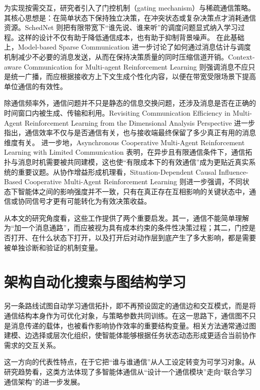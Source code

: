 为实现按需交互，研究者引入了门控机制（gating mechanism）与稀疏通信策略。其核心思想是：在简单状态下保持独立决策，在冲突状态或复杂决策点才消耗通信资源。SchedNet 则把有限带宽下“谁先说、谁来听”的调度问题显式纳入学习过程\cite{kim2019schednet}。这样的设计不仅有助于降低通信成本，也有助于抑制背景噪声。
在此基础上，Model-based Sparse Communication 进一步讨论了如何通过消息估计与调度机制减少不必要的消息发送，从而在保持决策质量的同时压缩信道开销\cite{han2023mbc}。Context-aware Communication for Multi-agent Reinforcement Learning 则强调消息不应只是统一广播，而应根据接收方上下文生成个性化内容，以便在带宽受限场景下提高单位通信的有效性\cite{li2024cacom}。

除通信频率外，通信问题并不只是静态的信息交换问题，还涉及消息是否在正确的时间窗口内被生成、传输和利用。Revisiting Communication Efficiency in Multi-Agent Reinforcement Learning from the Dimensional Analysis Perspective 进一步指出，通信效率不仅与是否通信有关，也与接收端最终保留了多少真正有用的消息维度有关\cite{sun2025drmac}。
进一步地，Asynchronous Cooperative Multi-Agent Reinforcement Learning with Limited Communication 表明，在异步且有限通信条件下，通信拓扑与消息时机需要被共同建模，这也使“有限成本下的有效通信”成为更贴近真实系统的重要议题\cite{dolan2025asyncomarl}。从协作增益形成机理看，Situation-Dependent Causal Influence-Based Cooperative Multi-Agent Reinforcement Learning 则进一步强调，不同状态下智能体之间的影响强度并不一致，只有在真正存在互相影响的关键状态中，通信或协同信号才更有可能转化为有效决策收益\cite{du2024scic}。

从本文的研究角度看，这些工作提供了两个重要启发。其一，通信不能简单理解为“加一个消息通路”，而应被视为具有成本约束的条件性决策过程；其二，门控是否打开、在什么状态下打开，以及打开后对动作层到底产生了多大影响，都是需要被单独诊断和验证的机制变量。

\section{架构自动化搜索与图结构学习}

另一条路线试图自动学习通信拓扑，即不再预设固定的通信边和交互模式，而是将通信结构本身作为可优化对象，与策略参数共同训练。在这一思路下，通信图不只是消息传递的载体，也被看作影响协作效率的重要结构变量。相关方法通常通过图建模、边选择或层次化组织，使智能体能够根据任务状态动态形成更适合当前协作需求的交互关系。

这一方向的代表性特点，在于它把“谁与谁通信”从人工设定转变为可学习对象。从研究趋势看，这类方法体现了多智能体通信从“设计一个通信模块”走向“联合学习通信架构”的进一步发展。

